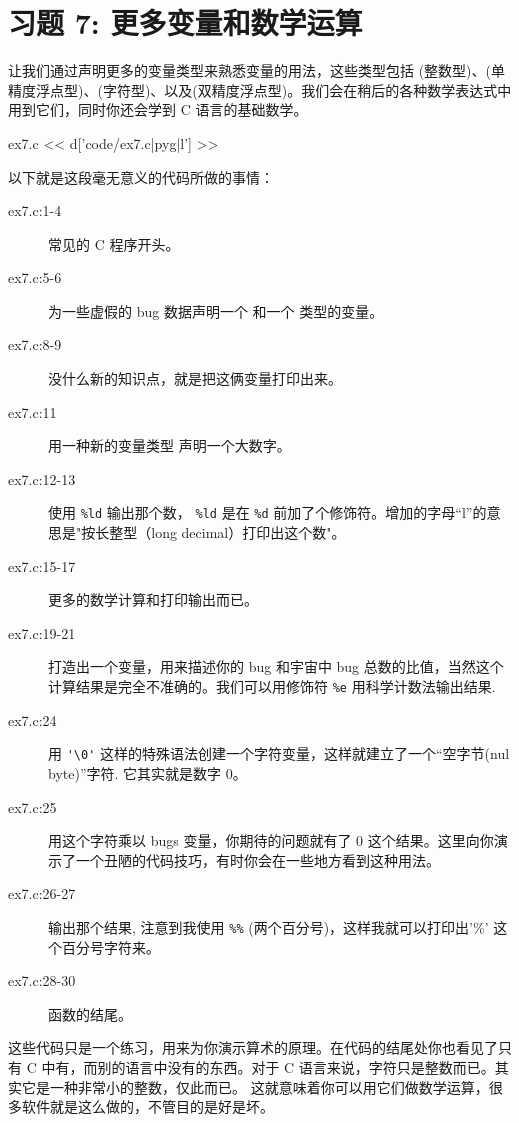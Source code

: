\chapter{习题 7: 更多变量和数学运算}

让我们通过声明更多的变量类型来熟悉变量的用法，这些类型包括 (整数型)、(单精度浮点型)、(字符型)、以及(双精度浮点型)。我们会在稍后的各种数学表达式中用到它们，同时你还会学到 C 语言的基础数学。

\begin{code}{ex7.c}
<< d['code/ex7.c|pyg|l'] >>
\end{code}

以下就是这段毫无意义的代码所做的事情：

\begin{description}
\item[ex7.c:1-4] 常见的 C 程序开头。
\item[ex7.c:5-6] 为一些虚假的 bug 数据声明一个  和一个  类型的变量。
\item[ex7.c:8-9] 没什么新的知识点，就是把这俩变量打印出来。
\item[ex7.c:11] 用一种新的变量类型  声明一个大数字。
\item[ex7.c:12-13] 使用 \verb|%ld| 输出那个数， \verb|%ld| 是在 \verb|%d| 前加了个修饰符。增加的字母“l”的意思是"按长整型（long decimal）打印出这个数"。
\item[ex7.c:15-17] 更多的数学计算和打印输出而已。
\item[ex7.c:19-21] 打造出一个变量，用来描述你的 bug 和宇宙中 bug 总数的比值，当然这个计算结果是完全不准确的。我们可以用修饰符 \verb|%e|  用科学计数法输出结果.
\item[ex7.c:24] 用 \verb|'\0'| 这样的特殊语法创建一个字符变量，这样就建立了一个“空字节(nul byte)”字符.  它其实就是数字 0。
\item[ex7.c:25] 用这个字符乘以 bugs 变量，你期待的问题就有了 0 这个结果。这里向你演示了一个丑陋的代码技巧，有时你会在一些地方看到这种用法。
\item[ex7.c:26-27] 输出那个结果, 注意到我使用 \verb|%%| (两个百分号)，这样我就可以打印出'\%' 这个百分号字符来。
\item[ex7.c:28-30]  函数的结尾。
\end{description}

这些代码只是一个练习，用来为你演示算术的原理。在代码的结尾处你也看见了只有 C 中有，而别的语言中没有的东西。对于 C 语言来说，字符只是整数而已。其实它是一种非常小的整数，仅此而已。 这就意味着你可以用它们做数学运算，很多软件就是这么做的，不管目的是好是坏。

